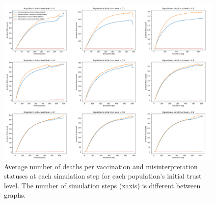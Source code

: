 \begin{figure}[!htb]
    \centering
        \includegraphics[width=\linewidth]{pics/DVM.png}
    \endminipage{}
    \caption{Average number of deaths per vaccination and misinterpretation statuses at each simulation step for each population's initial trust level. The number of simulation steps (xaxis) is different between graphs.}
    \label{fig:dvm}
\end{figure}
